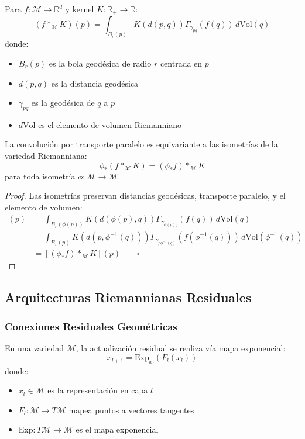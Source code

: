 \begin{definition}
Para \(f: \mathcal{M} \to \mathbb{R}^d\) y kernel \(K: \mathbb{R}_+ \to \mathbb{R}\):
\[
(f *_\mathcal{M} K)(p) = \int_{B_r(p)} K(d(p,q)) \Gamma_{\gamma_{pq}}(f(q)) \, d\text{Vol}(q)
\]
donde:
\begin{itemize}
	\item \(B_r(p)\) es la bola geodésica de radio \(r\) centrada en \(p\)
	\item \(d(p,q)\) es la distancia geodésica
	\item \(\gamma_{pq}\) es la geodésica de \(q\) a \(p\)
	\item \(d\text{Vol}\) es el elemento de volumen Riemanniano
\end{itemize}
\end{definition}

\begin{theorem}
La convolución por transporte paralelo es equivariante a
las isometrías de la variedad Riemanniana:
\[
\phi_*(f *_\mathcal{M} K) = (\phi_* f) *_\mathcal{M} K
\]
para toda isometría \(\phi: \mathcal{M} \to \mathcal{M}\).
\end{theorem}

\begin{proof}
Las isometrías preservan distancias geodésicas, transporte paralelo, y el elemento de volumen:
\begin{align}
[(f *_\mathcal{M} K) \circ \phi](p) &= \int_{B_r(\phi(p))} K(d(\phi(p),q)) \Gamma_{\gamma_{\phi(p)q}}(f(q)) \, d\text{Vol}(q) \\
&= \int_{B_r(p)} K(d(p,\phi^{-1}(q))) \Gamma_{\gamma_{p\phi^{-1}(q)}}(f(\phi^{-1}(q))) \, d\text{Vol}(\phi^{-1}(q)) \\
&= [(\phi_* f) *_\mathcal{M} K](p) \qquad \square
\end{align}
\end{proof}

\subsection{Arquitecturas Riemannianas Residuales}

\subsubsection{Conexiones Residuales Geométricas}

\begin{definition}
En una variedad \(\mathcal{M}\), la actualización residual se realiza vía mapa exponencial:
\[
x_{l+1} = \text{Exp}_{x_l}(F_l(x_l))
\]
donde:
\begin{itemize}
	\item \(x_l \in \mathcal{M}\) es la representación en capa \(l\)
	\item \(F_l: \mathcal{M} \to T\mathcal{M}\) mapea puntos a vectores tangentes
	\item \(\text{Exp}: T\mathcal{M} \to \mathcal{M}\) es el mapa exponencial
\end{itemize}
\end{definition}

